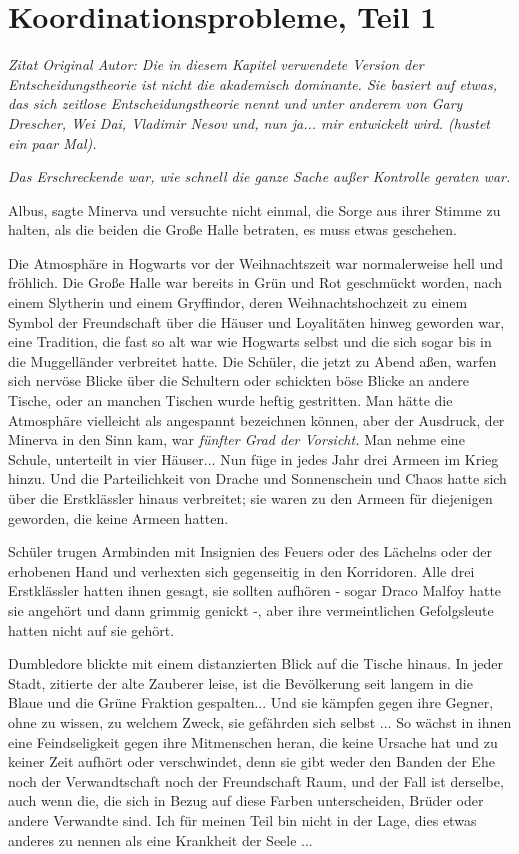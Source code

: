 \chapter{Koordinationsprobleme, Teil 1}

\emph{Zitat Original Autor: Die in diesem Kapitel verwendete Version der
Entscheidungstheorie ist nicht die akademisch dominante. Sie basiert auf etwas,
das sich \glqq{}zeitlose Entscheidungstheorie\grqq{} nennt und unter anderem von
Gary Drescher, Wei Dai, Vladimir Nesov und, nun ja... mir entwickelt wird.
(hustet ein paar Mal).}

\emph{Das Erschreckende war, wie schnell die ganze Sache außer Kontrolle
geraten war.}

\glqq{}Albus\grqq{}, sagte Minerva und versuchte nicht einmal, die Sorge aus
ihrer Stimme zu halten, als die beiden die Große Halle betraten, \glqq{}es muss
etwas geschehen.\grqq{}

Die Atmosphäre in Hogwarts vor der Weihnachtszeit war normalerweise hell und
fröhlich. Die Große Halle war bereits in Grün und Rot geschmückt worden, nach
einem Slytherin und einem Gryffindor, deren Weihnachtshochzeit zu einem Symbol
der Freundschaft über die Häuser und Loyalitäten hinweg geworden war, eine
Tradition, die fast so alt war wie Hogwarts selbst und die sich sogar bis in die
Muggelländer verbreitet hatte. Die Schüler, die jetzt zu Abend aßen, warfen sich
nervöse Blicke über die Schultern oder schickten böse Blicke an andere Tische,
oder an manchen Tischen wurde heftig gestritten. Man hätte die Atmosphäre
vielleicht als angespannt bezeichnen können, aber der Ausdruck, der Minerva in
den Sinn kam, war \emph{fünfter Grad der Vorsicht.} Man nehme eine Schule,
unterteilt in vier Häuser... Nun füge in jedes Jahr drei Armeen im Krieg hinzu.
Und die Parteilichkeit von Drache und Sonnenschein und Chaos hatte sich über die
Erstklässler hinaus verbreitet; sie waren zu den Armeen für diejenigen geworden,
die keine Armeen hatten.

Schüler trugen Armbinden mit Insignien des Feuers oder des Lächelns oder der
erhobenen Hand und verhexten sich gegenseitig in den Korridoren. Alle drei
Erstklässler hatten ihnen gesagt, sie sollten aufhören - sogar Draco Malfoy
hatte sie angehört und dann grimmig genickt -, aber ihre vermeintlichen
Gefolgsleute hatten nicht auf sie gehört.

Dumbledore blickte mit einem distanzierten Blick auf die Tische hinaus. \glqq{}In
jeder Stadt\grqq{}, zitierte der alte Zauberer leise, \glqq{}ist die Bevölkerung
seit langem in die Blaue und die Grüne Fraktion gespalten... Und sie kämpfen
gegen ihre Gegner, ohne zu wissen, zu welchem Zweck, sie gefährden sich selbst
... So wächst in ihnen eine Feindseligkeit gegen ihre Mitmenschen heran, die
keine Ursache hat und zu keiner Zeit aufhört oder verschwindet, denn sie gibt
weder den Banden der Ehe noch der Verwandtschaft noch der Freundschaft Raum, und
der Fall ist derselbe, auch wenn die, die sich in Bezug auf diese Farben
unterscheiden, Brüder oder andere Verwandte sind. Ich für meinen Teil bin nicht
in der Lage, dies etwas anderes zu nennen als eine Krankheit der Seele ...\grqq{}

